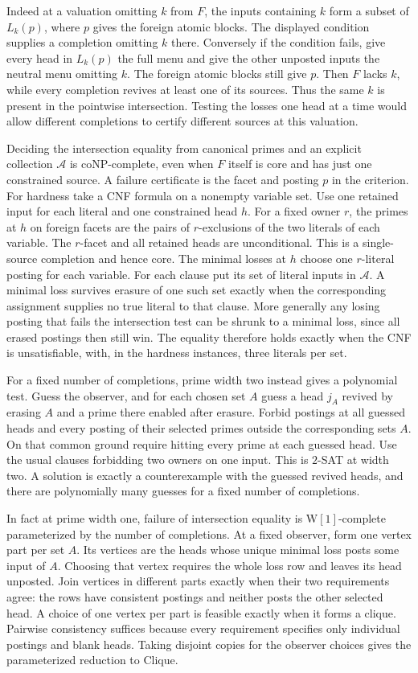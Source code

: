 Indeed at a valuation omitting $k$ from $F$,
the inputs containing $k$ form a subset of
$L_k(p)$, where $p$ gives the foreign atomic
blocks. The displayed condition supplies a
completion omitting $k$ there. Conversely if
the condition fails, give every head in
$L_k(p)$ the full menu and give the other
unposted inputs the neutral menu omitting $k$.
The foreign atomic blocks still give $p$.
Then $F$ lacks $k$, while every completion
revives at least one of its sources. Thus the
same $k$ is present in the pointwise intersection.
Testing the losses one head at a time would
allow different completions to certify different
sources at this valuation.

Deciding the intersection equality from canonical
primes and an explicit collection $\mathcal A$
is coNP-complete, even when $F$ itself is core
and has just one constrained source. A failure
certificate is the facet and posting $p$ in the
criterion. For hardness take a CNF formula on
a nonempty variable set. Use one retained input
for each literal and one constrained head $h$.
For a fixed owner $r$, the primes at $h$ on
foreign facets are the pairs of $r$-exclusions
of the two literals of each variable. The
$r$-facet and all retained heads are unconditional.
This is a single-source completion and hence
core. The minimal losses at $h$ choose one
$r$-literal posting for each variable. For each
clause put its set of literal inputs in
$\mathcal A$. A minimal loss survives erasure
of one such set exactly when the corresponding
assignment supplies no true literal to that
clause. More generally any losing posting that
fails the intersection test can be shrunk to a
minimal loss, since all erased postings then
still win. The equality therefore holds exactly
when the CNF is unsatisfiable, with, in the
hardness instances, three literals per set.

For a fixed number of completions, prime width two
instead gives a polynomial test. Guess the observer,
and for each chosen set $A$ guess a head $j_A$ revived
by erasing $A$ and a prime there enabled after erasure.
Forbid postings at all guessed heads and every
posting of their selected primes outside the
corresponding sets $A$. On that common ground
require hitting every prime at each guessed head.
Use the usual clauses forbidding two owners on
one input. This is $2$-SAT at width two. A
solution is exactly a counterexample with the
guessed revived heads, and there are polynomially
many guesses for a fixed number of completions.

In fact at prime width one, failure of intersection
equality is $\mathrm{W[1]}$-complete parameterized
by the number of completions. At a fixed observer,
form one vertex part per set $A$. Its vertices are
the heads whose unique minimal loss posts some
input of $A$. Choosing that vertex requires the
whole loss row and leaves its head unposted.
Join vertices in different parts exactly when
their two requirements agree: the rows have
consistent postings and neither posts the other
selected head. A choice of one vertex per part
is feasible exactly when it forms a clique.
Pairwise consistency suffices because every
requirement specifies only individual postings
and blank heads. Taking disjoint copies for the
observer choices gives the parameterized reduction
to Clique.

